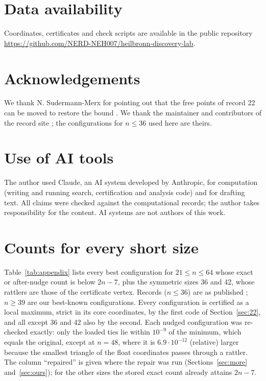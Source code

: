 \documentclass[11pt]{amsart}
\theoremstyle{definition}
\begin{document}
\section*{Data availability}
Coordinates, certificates and check scripts are available in the public repository \url{https://github.com/NERD-NEH007/heilbronn-discovery-lab}.

\section*{Acknowledgements}
We thank N. Sudermann-Merx for pointing out that the free points of record 22 can be moved to restore the bound \cite{SMpc}. We thank the maintainer and contributors of the record site \cite{Stead}; the configurations for $n \le 36$ used here are theirs.

\section*{Use of AI tools}
The author used Claude, an AI system developed by Anthropic, for computation (writing and running search, certification and analysis code) and for drafting text. All claims were checked against the computational records; the author takes responsibility for the content. AI systems are not authors of this work.

\appendix
\section{Counts for every short size}\label{app:table}

Table~\ref{tab:appendix} lists every best configuration for $21 \le n \le 64$ whose exact or after-nudge count is below $2n-7$, plus the symmetric sizes 36 and 42, whose rattlers are those of the certificate vertex. Records ($n \le 36$) are as published \cite{Stead}; $n \ge 39$ are our best-known configurations. Every configuration is certified as a local maximum, strict in its core coordinates, by the first code of Section~\ref{sec:22}, and all except 36 and 42 also by the second. Each nudged configuration was re-checked exactly: only the loaded ties lie within $10^{-9}$ of the minimum, which equals the original, except at $n = 48$, where it is $6.9\cdot10^{-12}$ (relative) larger because the smallest triangle of the float coordinates passes through a rattler. The column ``repaired'' is given where the repair was run (Sections~\ref{sec:more} and~\ref{sec:ours}); for the other sizes the stored exact count already attains $2n-7$. %
\end{document}
